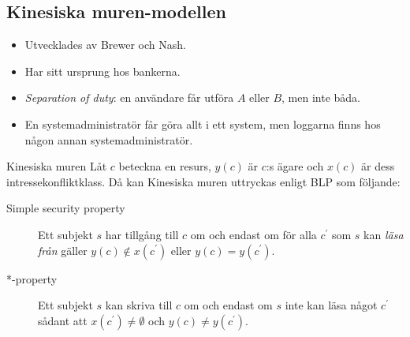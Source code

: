 \subsection{Kinesiska muren-modellen}
\begin{frame}{\insertsubsectionhead}
  \begin{itemize}
    \item Utvecklades av Brewer och Nash.
    \item Har sitt ursprung hos bankerna.
    \item \emph{Separation of duty}: en användare får utföra \(A\) eller \(B\), 
      men inte båda.
    \item En systemadministratör får göra allt i ett system, men loggarna finns 
      hos någon annan systemadministratör.
  \end{itemize}
\end{frame}
\begin{frame}{\insertsubsectionhead}
  \begin{block}{Kinesiska muren}
    Låt \(c\) beteckna en resurs, \(y(c)\) är \(c\):s ägare och \(x(c)\) är 
    dess intressekonfliktklass.
    Då kan Kinesiska muren uttryckas enligt BLP som följande:
    \begin{description}
      \item[Simple security property] Ett subjekt \(s\) har tillgång till \(c\) 
        om och endast om för alla \(c^\prime\) som \(s\) kan \emph{läsa från} 
        gäller \(y(c)\notin x(c^\prime)\) eller \(y(c) = y(c^\prime)\).
      \item[*-property] Ett subjekt \(s\) kan skriva till \(c\) om och endast 
        om \(s\) inte kan läsa något \(c^\prime\) sådant att \(x(c^\prime)\neq 
        \emptyset\) och \(y(c)\neq y(c^\prime)\).
    \end{description}
  \end{block}
\end{frame}

